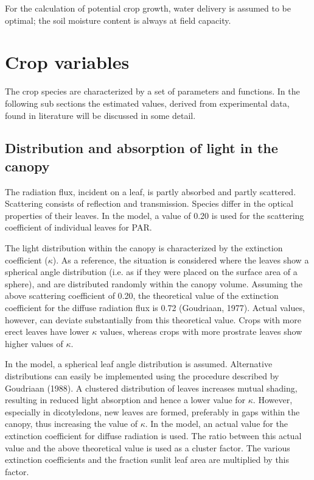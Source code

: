 For the calculation of potential crop growth, water delivery is assumed to be optimal; the
soil moisture content is always at field capacity.

\section{Crop variables}

The crop species are characterized by a set of parameters and functions. In the following
sub sections the estimated values, derived from experimental data, found in literature will
be discussed in some detail.

\subsection{Distribution and absorption of light in the canopy} 

The radiation flux, incident on a leaf, is partly absorbed and partly scattered. Scattering
consists of reflection and transmission. Species differ in the optical properties of their
leaves. In the model, a value of 0.20 is used for the scattering coefficient of individual 
leaves for PAR.

The light distribution within the canopy is characterized by the extinction coefficient ($\kappa$).
As a reference, the situation is considered where the leaves show a spherical angle
distribution (i.e. as if they were placed on the surface area of a sphere), and are 
distributed randomly within the canopy volume. Assuming the above scattering coefficient of
0.20, the theoretical value of the extinction coefficient for the diffuse radiation flux is
0.72 (Goudriaan, 1977). Actual values, however, can deviate substantially from this
theoretical value. Crops with more erect leaves have lower $\kappa$ values, whereas crops with
more prostrate leaves show higher values of $\kappa$. 

In the model, a spherical leaf angle
distribution is assumed. Alternative distributions can easily be implemented using the
procedure described by Goudriaan (1988). A clustered distribution of leaves increases
mutual shading, resulting in reduced light absorption and hence a lower value for $\kappa$.
However, especially in dicotyledons, new leaves are formed, preferably in gaps within the
canopy, thus increasing the value of $\kappa$. In the model, an actual value for the extinction
coefficient for diffuse radiation is used. The ratio between this actual value and the above
theoretical value is used as a cluster factor. The various extinction coefficients and the
fraction sunlit leaf area are multiplied by this factor.

